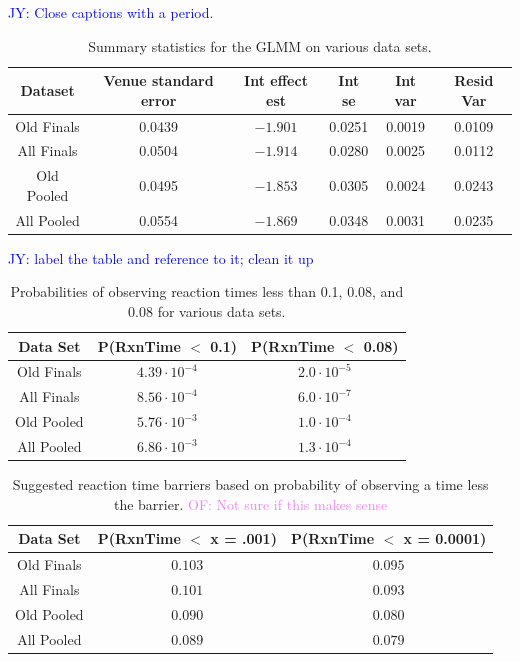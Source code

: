 \documentclass[12pt, letterpaper, titlepage]{article}
\newcommand{\jy}[1]{\textcolor{blue}{JY: #1}}
\newcommand{\of}[1]{\textcolor{violet}{OF: #1}}
\begin{document}
\jy{Close captions with a period.}
\begin{table}
  \centering
  \caption{Summary statistics for the GLMM on various data sets.} 
  \begin{tabular}{c c c c c c}
      \toprule
      Dataset & Venue standard error & Int effect est & Int se & Int var & Resid Var \\
      \midrule
      Old Finals & 0.0439 & $-1.901$ & 0.0251 & 0.0019 & 0.0109 \\
      All Finals & 0.0504 & $-1.914$ & 0.0280 & 0.0025 & 0.0112 \\
      Old Pooled & 0.0495 & $-1.853$ & 0.0305 & 0.0024 & 0.0243 \\
      All Pooled & 0.0554 & $-1.869$ & 0.0348 & 0.0031 & 0.0235 \\
      \bottomrule
  \end{tabular}
  \label{tab:Gamma_parameters}
\end{table}


\jy{label the table and reference to it; clean it up}
\begin{table}
  \centering
  \caption{Probabilities of observing reaction times less than 0.1, 0.08, and
  0.08 for various data sets.}
  \begin{tabular}{c c c} 
   \toprule
   Data Set & P(RxnTime $<$ 0.1) & P(RxnTime $<$ 0.08) \\ 
   \midrule
   Old Finals & $4.39\cdot10^{-4}$ & $2.0\cdot10^{-5}$ \\
   All Finals & $8.56\cdot10^{-4}$ & $6.0\cdot10^{-7}$ \\
   Old Pooled & $5.76\cdot10^{-3}$ & $1.0\cdot10^{-4}$ \\ 
   All Pooled & $6.86\cdot10^{-3}$ & $1.3\cdot10^{-4}$ \\
   \bottomrule
  \end{tabular}
  \label{tab:Sim_probability}
\end{table}

\begin{table}
  \centering
  \caption{Suggested reaction time barriers based on probability of observing
  a time less the barrier. \of{Not sure if this makes sense}}
  \begin{tabular}{c c c} 
   \toprule
   Data Set & P(RxnTime $<$ x = .001) & P(RxnTime $<$ x = 0.0001) \\ 
   \midrule
   Old Finals & $0.103$ & $0.095$ \\
   All Finals & $0.101$ & $0.093$ \\
   Old Pooled & $0.090$ & $0.080$ \\ 
   All Pooled & $0.089$ & $0.079$ \\
   \bottomrule
  \end{tabular}
  \label{tab:Sim_time}
\end{table}
\end{document}
